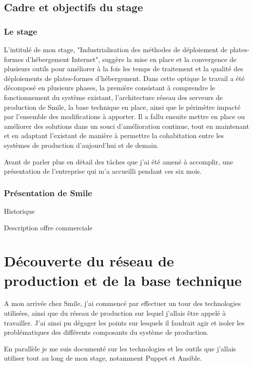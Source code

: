 \documentclass[14 pt]{extreport}
\begin{document}
\section{Cadre et objectifs du stage}

\subsection{Le stage}L'intitulé de mon stage, "Industrialisation des méthodes de déploiement de plates-formes d'hébergement Internet", suggère la mise en place et la convergence de plusieurs outils pour améliorer à la fois les temps de traitement et la qualité des déploiements de plates-formes d'hébergement. Dans cette optique le travail a été décomposé en plusieurs phases, la première consistant à comprendre le fonctionnement du système existant, l'architecture réseau des serveurs de production de Smile, la base technique en place, ainsi que le périmètre impacté par l'ensemble des modifications à apporter. Il a fallu ensuite mettre en place ou améliorer des solutions dans un souci d'amélioration continue, tout en maintenant et en adaptant l'existant de manière à permettre la cohabitation entre les systèmes de production d'aujourd'hui et de demain.

Avant de parler plus en détail des tâches que j'ai été amené à accomplir, une présentation de l'entreprise qui m'a accueilli pendant ces six mois.

\subsection{Présentation de Smile}
\lipsum
Historique

Description offre commerciale

\chapter{Découverte du réseau de production et de la base technique}

A mon arrivée chez Smile, j'ai commencé par effectuer un tour des technologies utilisées, ainsi que du réseau de production sur lequel j'allais être appelé à travailler. J'ai ainsi pu dégager les points sur lesquels il faudrait agir et isoler les problématiques des différents composants du système de production.

En parallèle je me suis documenté sur les technologies et les outils que j'allais utiliser tout au long de mon stage, notamment Puppet et Ansible.
\end{document}
